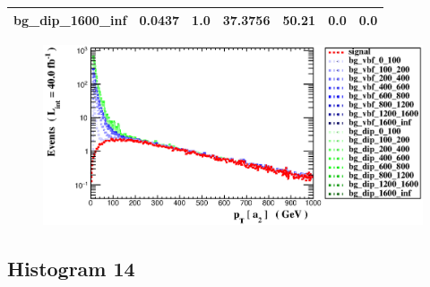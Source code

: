 \documentclass[a4paper, 10pt]{article}
\begin{document}
\begin{table}[H]
\begin{center}
\begin{tabular}{|m{23.0mm}|m{23.0mm}|m{18.0mm}|m{19.0mm}|m{19.0mm}|m{19.0mm}|m{19.0mm}|}
      \hline
      {\cellcolor{white}         bg\_dip\_1600\_inf}& {\cellcolor{white}         0.0437}& {\cellcolor{white}         1.0}& {\cellcolor{white}         37.3756}& {\cellcolor{white}         50.21}& {\cellcolor{green}         0.0}& {\cellcolor{green}         0.0}\\
\hline
    \end{tabular}
  \end{center}
\end{table}

\begin{figure}[H]
  \begin{center}
    \includegraphics[scale=0.45]{selection_12.eps}\\
\caption{   }
  \end{center}
\end{figure}
      \newpage
\subsection{ Histogram 14}
\end{document}
